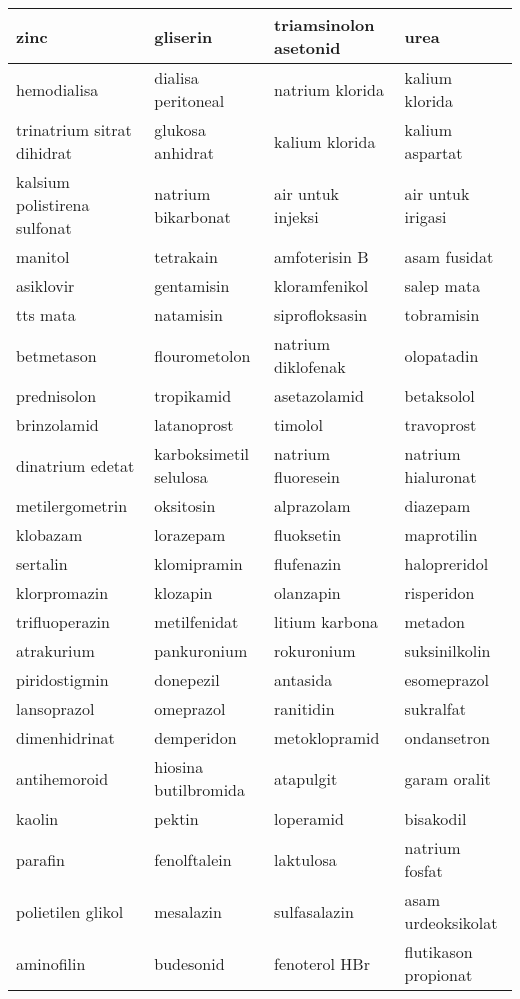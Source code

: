 \begin{longtable}{|p{}|p{}|p{}|p{}|}
	zinc & gliserin & triamsinolon asetonid & urea \\ \hline
	hemodialisa & dialisa peritoneal & natrium klorida & kalium klorida \\ \hline
	trinatrium sitrat dihidrat & glukosa anhidrat & kalium klorida & kalium aspartat \\ \hline
	kalsium polistirena sulfonat & natrium bikarbonat & air untuk injeksi & air untuk irigasi \\ \hline
	manitol & tetrakain & amfoterisin B & asam fusidat \\ \hline
	asiklovir & gentamisin & kloramfenikol & salep mata \\ \hline
	tts mata & natamisin & siprofloksasin & tobramisin \\ \hline
	betmetason & flourometolon & natrium diklofenak & olopatadin \\ \hline
	prednisolon & tropikamid & asetazolamid & betaksolol \\ \hline
	brinzolamid & latanoprost & timolol & travoprost \\ \hline
	dinatrium edetat & karboksimetil selulosa & natrium fluoresein & natrium hialuronat \\ \hline
	metilergometrin & oksitosin & alprazolam & diazepam \\ \hline
	klobazam & lorazepam & fluoksetin & maprotilin \\ \hline
	sertalin & klomipramin & flufenazin & halopreridol \\ \hline
	klorpromazin & klozapin & olanzapin & risperidon \\ \hline
	trifluoperazin & metilfenidat & litium karbona & metadon \\ \hline
	atrakurium & pankuronium & rokuronium & suksinilkolin \\ \hline
	piridostigmin & donepezil & antasida & esomeprazol \\ \hline
	lansoprazol & omeprazol & ranitidin & sukralfat \\ \hline
	dimenhidrinat & demperidon & metoklopramid & ondansetron \\ \hline
	antihemoroid & hiosina butilbromida & atapulgit & garam oralit \\ \hline
	kaolin & pektin & loperamid & bisakodil \\ \hline
	parafin & fenolftalein & laktulosa & natrium fosfat \\ \hline
	polietilen glikol & mesalazin & sulfasalazin & asam urdeoksikolat \\ \hline
	aminofilin & budesonid & fenoterol HBr & flutikason propionat \\ \hline

\end{longtable}
